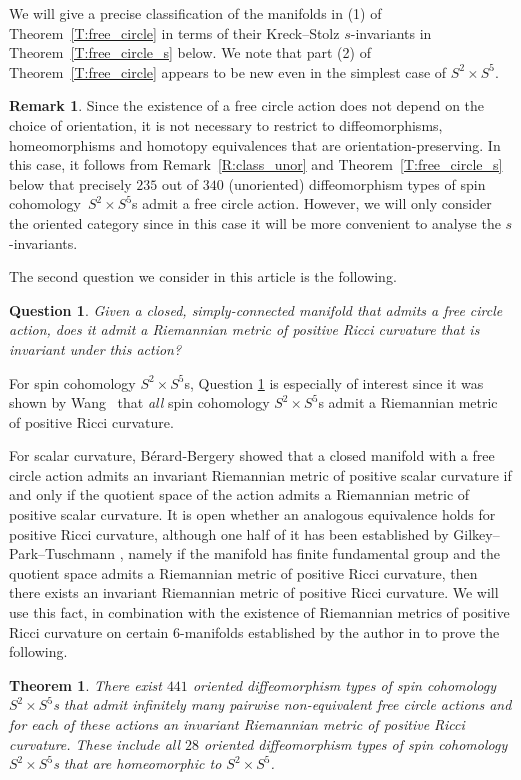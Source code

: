 \documentclass[pdftex]{sigma}
\numberwithin{equation}{section}
\newtheorem{theoremAlph}{Theorem}
\newtheorem{Question}[Theorem]{Question}
\theoremstyle{definition}
\newtheorem{Remark}[Theorem]{Remark}
\numberwithin{table}{section}
\begin{document}
We will give a precise classification of the manifolds in (1) of Theorem~\ref{T:free_circle} in terms of their Kreck--Stolz $s$-invariants in Theorem~\ref{T:free_circle_s} below. We note that part (2) of Theorem~\ref{T:free_circle} appears to be new even in the simplest case of $S^2\times S^5$.

\begin{Remark}
	Since the existence of a free circle action does not depend on the choice of orientation, it is not necessary to restrict to diffeomorphisms, homeomorphisms and homotopy equivalences that are orientation-preserving. In this case, it follows from Remark~\ref{R:class_unor} and Theorem~\ref{T:free_circle_s} below that precisely $235$ out of $340$ (unoriented) diffeomorphism types of spin cohomology~${S^2\times S^5}$s admit a free circle action. However, we will only consider the oriented category since in this case it will be more convenient to analyse the $s$-invariants.
\end{Remark}

The second question we consider in this article is the following.
\begin{Question}\label{Q:free_circ_Ric}
	Given a closed, simply-connected manifold that admits a free circle action, does it admit a Riemannian metric of positive Ricci curvature that is invariant under this action?
\end{Question}

For spin cohomology $S^2\times S^5$s, Question \ref{Q:free_circ_Ric} is especially of interest since it was shown by Wang~\cite{Wa22} that \emph{all} spin cohomology $S^2\times S^5$s admit a Riemannian metric of positive Ricci curvature.

For scalar curvature, B\'erard-Bergery \cite{BB83} showed that a closed manifold with a free circle action admits an invariant Riemannian metric of positive scalar curvature if and only if the quotient space of the action admits a Riemannian metric of positive scalar curvature. It is open whether an analogous equivalence holds for positive Ricci curvature, although one half of it has been established by Gilkey--Park--Tuschmann \cite{GPT98}, namely if the manifold has finite fundamental group and the quotient space admits a Riemannian metric of positive Ricci curvature, then there exists an invariant Riemannian metric of positive Ricci curvature. We will use this fact, in combination with the existence of Riemannian metrics of positive Ricci curvature on certain $6$-manifolds established by the author in \cite{Re24b} to prove the following.	
\begin{theoremAlph}\label{T:Ric>0}
	There exist $441$ oriented diffeomorphism types of spin cohomology $S^2\times S^5$s that admit infinitely many pairwise non-equivalent free circle actions and for each of these actions an invariant Riemannian metric of positive Ricci curvature. These include all $28$ oriented diffeomorphism types of spin cohomology $S^2\times S^5$s that are homeomorphic to $S^2\times S^5$.
\end{theoremAlph}
\end{document}
